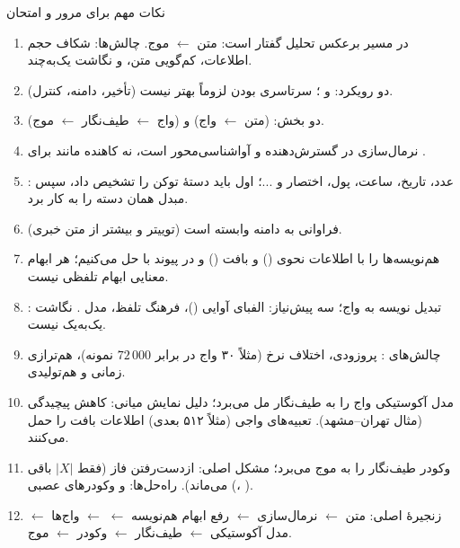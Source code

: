 \begin{exambox}{نکات مهم برای مرور و امتحان}
\begin{enumerate}
  \item در  مسیر برعکس تحلیل گفتار است: متن $\leftarrow$ موج. چالش‌ها: شکاف حجم اطلاعات، کم‌گویی متن، و نگاشت یک‌به‌چند.
  \item دو رویکرد:  و ؛ سرتاسری بودن لزوماً بهتر نیست (تأخیر، دامنه، کنترل).
  \item دو بخش:  (متن $\leftarrow$ واج) و  (واج $\leftarrow$ طیف‌نگار $\leftarrow$ موج).
  \item نرمال‌سازی در  گسترش‌دهنده و آواشناسی‌محور است، نه کاهنده مانند  برای .
  \item {}: عدد، تاریخ، ساعت، پول، اختصار و ...؛ اول باید دستهٔ توکن را تشخیص داد، سپس مبدل همان دسته را به کار برد.
  \item فراوانی  به دامنه وابسته است (توییتر و  بیشتر از متن خبری).
  \item هم‌نویسه‌ها را با اطلاعات نحوی () و بافت () و در پیوند با  حل می‌کنیم؛ هر ابهام معنایی ابهام تلفظی نیست.
  \item {}: تبدیل نویسه به واج؛ سه پیش‌نیاز: الفبای آوایی ()، فرهنگ تلفظ، مدل . نگاشت یک‌به‌یک نیست.
  \item چالش‌های : پروزودی، اختلاف نرخ (مثلاً ۳۰ واج در برابر $72\,000$ نمونه)، هم‌ترازی زمانی و هم‌تولیدی.
  \item مدل آکوستیکی واج را به طیف‌نگار مل می‌برد؛ دلیل نمایش میانی: کاهش پیچیدگی (مثال تهران–مشهد). تعبیه‌های واجی (مثلاً ۵۱۲ بعدی) اطلاعات بافت را حمل می‌کنند.
  \item وکودر طیف‌نگار را به موج می‌برد؛ مشکل اصلی: ازدست‌رفتن فاز (فقط $|X|$ باقی می‌ماند). راه‌حل‌ها:  و وکودرهای عصبی (، ).
  \item زنجیرهٔ اصلی: متن $\leftarrow$ نرمال‌سازی $\leftarrow$ رفع ابهام هم‌نویسه $\leftarrow$  $\leftarrow$ واج‌ها $\leftarrow$ مدل آکوستیکی $\leftarrow$ طیف‌نگار $\leftarrow$ وکودر $\leftarrow$ موج.
\end{enumerate}
\end{exambox}
